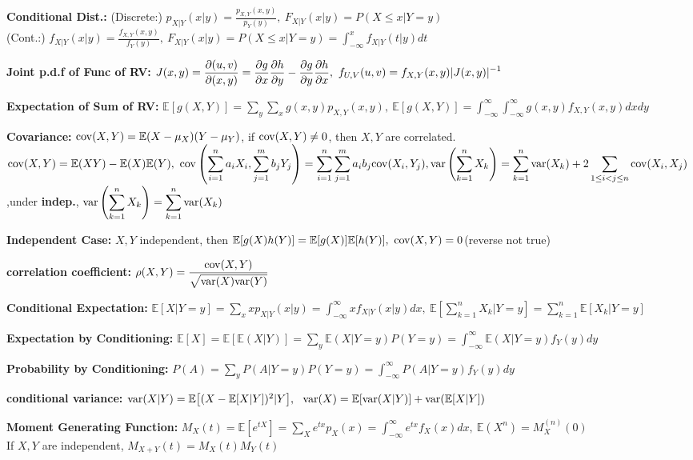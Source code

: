 \documentclass[10pt, a4paper]{article}
\newcommand{\E}{{\mathbb{E}}}
\newcommand{\var}{{\rm var}}
\newcommand{\disp}{\displaystyle}
\begin{document}
\begin{spacing}{1}
    {\bf Conditional Dist.: }
    (Discrete:) $\disp p_{X|Y}(x|y)=\frac{p_{X,Y}(x,y)}{p_Y(y)},\ 
    F_{X|Y}(x|y)=P(X\le x|Y=y)$\\
    (Cont.:) $\disp f_{X|Y}(x|y)=\frac{f_{X,Y}(x,y)}{f_Y(y)},\ 
    F_{X|Y}(x|y)=P(X\le x|Y=y)=\int_{-\infty}^x f_{X|Y}(t|y)dt$

    {\bf Joint p.d.f of Func of RV: }
    $\disp J(x,y)=\frac{\pt (u,v)}{\pt (x,y)}=
    \frac{\pt g}{\pt x}\frac{\pt h}{\pt y}-\frac{\pt g}{\pt y}\frac{\pt h}{\pt x},\ 
    f_{U,V}(u,v)=f_{X,Y}(x,y)|J(x,y)|^{-1}$

    \vspace{0.25in}
    {\bf Expectation of Sum of RV: }
    $\disp \E[g(X,Y)]=\sum_y \sum_x g(x,y)p_{X,Y}(x,y),\ 
    \E[g(X,Y)]=\int_{-\infty}^{\infty} \int_{-\infty}^{\infty} g(x,y) f_{X,Y}(x,y)dxdy$

    \newcommand{\cov}{{\rm cov}}
    {\bf Covariance: } ${\rm cov}(X,Y)=\E(X-\mu_X)(Y-\mu_Y)$, 
    if ${\rm cov}(X,Y)\ne 0$, then $X, Y$ are correlated.\\
    $\disp \cov(X,Y)=\E(XY)-\E(X)\E(Y),\ 
    \cov\left(\sum_{i=1}^n a_iX_i, \sum_{j=1}^m b_jY_j\right)=
    \sum_{i=1}^n \sum_{j=1}^m a_ib_j\cov(X_i,Y_j),\\ 
    \var\left(\sum_{k=1}^n X_k\right)=\sum_{k=1}^n \var(X_k)+
    2\sum_{1\le i<j\le n} \cov(X_i,X_j)$,\qquad under {\bf indep.},
    $\disp \var\left(\sum_{k=1}^n X_k\right)=\sum_{k=1}^n \var(X_k)$

    {\bf Independent Case: } $X,Y$ independent, then 
    $\E[g(X)h(Y)]=\E[g(X)]\E[h(Y)],\ \cov(X,Y)=0$(reverse not true)

    {\bf correlation coefficient:} $\disp \rho(X,Y)=\frac{\cov(X,Y)}{\sqrt{\var(X)\var(Y)}}$

    {\bf Conditional Expectation:} 
    $\disp \E[X|Y=y]=\sum_{x} xp_{X|Y}(x|y)=\int_{-\infty}^{\infty} xf_{X|Y}(x|y) dx,\ 
    \E\left[\sum_{k=1}^n X_k|Y=y\right]=\sum_{k=1}^n \E[X_k|Y=y]$

    {\bf Expectation by Conditioning:} 
    $\disp \E[X]=\E[\E(X|Y)]=\sum_{y} \E(X|Y=y)P(Y=y)=\int_{-\infty}^{\infty}\E(X|Y=y)f_Y(y)dy$

    {\bf Probability by Conditioning:}
    $\disp P(A)=\sum_y P(A|Y=y)P(Y=y)=\int_{-\infty}^{\infty}P(A|Y=y)f_Y(y)dy$

    {\bf conditional variance: }
    $\var(X|Y)=\E\bigl[(X-\E[X|Y])^2|Y\bigr],\ \ 
    \var(X)=\E[\var(X|Y)]+\var(\E[X|Y])$

    \vspace{0.3in}
    {\bf Moment Generating Function: }
    $\disp M_X(t)=\E[e^{tX}]=\sum_{X} e^{tx}p_X(x)=\int_{-\infty}^{\infty} e^{tx}f_X(x)dx,\ 
    \E(X^n)=M_X^{(n)}(0)$\\
    If $X,Y$ are independent, $M_{X+Y}(t)=M_X(t)M_Y(t)$


\end{spacing}
\end{document}
